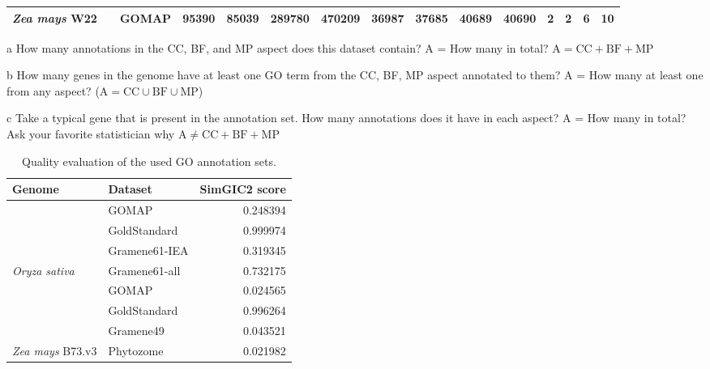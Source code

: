 \documentclass[utf8]{frontiersSCNS}
\begin{document}
\begin{table}[t]
{\begin{threeparttable}
\begin{tabular}{lrlrrr>{\bfseries}r|rrr>{\bfseries}r|rrr>{\bfseries}r}
\textit{Zea mays} W22 & \multirow{-20}{*}{\raggedleft\arraybackslash 100} & GOMAP & 95390 & 85039 & 289780 & 470209 & 36987 & 37685 & 40689 & 40690 & 2 & 2 & 6 & 10\\
\bottomrule
\end{tabular}
\begin{tablenotes}
\item[a] How many annotations in the CC, BF, and MP aspect does this dataset contain? A = How many in total? $\textrm{A} = \textrm{CC} + \textrm{BF} + \textrm{MP}$
\item[b] How many genes in the genome have at least one GO term from the CC, BF, MP aspect annotated to them? A = How many at least one from any aspect? ($\textrm{A} = \textrm{CC} \cup \textrm{BF} \cup \textrm{MP}$)
\item[c] Take a typical gene that is present in the annotation set. How many annotations does it have in each aspect? A = How many in total? Ask your favorite statistician why $\textrm{A} \neq \textrm{CC} + \textrm{BF} +\textrm{MP}$
\end{tablenotes}
\end{threeparttable}}
\end{table}

\begin{table}[t]

\caption{\label{tab:quality-table}Quality evaluation of the used GO annotation sets.}
\centering
\begin{tabular}{llr}
\toprule
Genome & Dataset & SimGIC2 score\\
\midrule
\rowcolor{gray!6}   & GOMAP & 0.248394\\

 & GoldStandard & 0.999974\\

\rowcolor{gray!6}   & Gramene61-IEA & 0.319345\\

\multirow{-4}{*}{\raggedright\arraybackslash \textit{Oryza sativa}} & Gramene61-all & 0.732175\\
\cmidrule{1-3}
\rowcolor{gray!6}   & GOMAP & 0.024565\\

 & GoldStandard & 0.996264\\

\rowcolor{gray!6}   & Gramene49 & 0.043521\\

\multirow{-4}{*}{\raggedright\arraybackslash \textit{Zea mays} B73.v3} & Phytozome & 0.021982\\
\bottomrule
\end{tabular}
\end{table}


\end{document}
